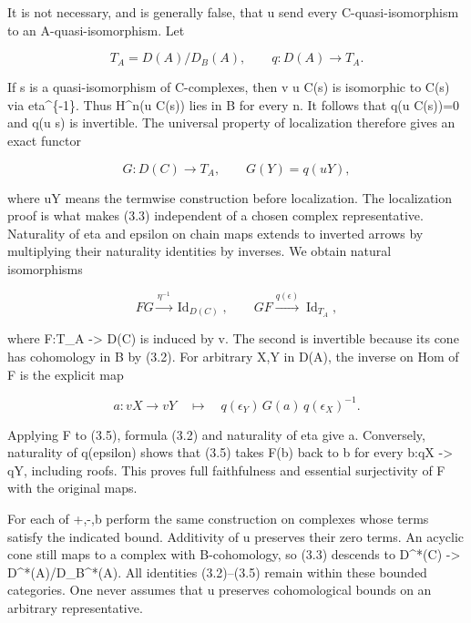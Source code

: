 \documentclass[11pt]{article}
\begin{document}
It is not necessary,\allowbreak{} and is generally false,\allowbreak{} that u send every C-quasi-isomorphism to an A-quasi-isomorphism. Let

\[
 T_A=D(A)/D_B(A),\qquad q:D(A)\longrightarrow T_A.
\]

If s is a quasi-isomorphism of C-complexes,\allowbreak{} then v u C(s)\allowbreak{} is isomorphic to C(s)\allowbreak{} via eta\^{}\{-1\}. Thus H\^{}n(u C(s)\allowbreak{})\allowbreak{} lies in B for every n. It follows that q(u C(s)\allowbreak{})\allowbreak{}\allowbreak{}=0 and q(u s)\allowbreak{} is invertible. The universal property of localization therefore gives an exact functor

\[
 G:D(C)\longrightarrow T_A,\qquad G(Y)=q(uY),              \tag{3.3}
\]

where uY means the termwise construction before localization. The localization proof is what makes (3.3)\allowbreak{} independent of a chosen complex representative. Naturality of eta and epsilon on chain maps extends to inverted arrows by multiplying their naturality identities by inverses. We obtain natural isomorphisms

\[
 F G\xrightarrow{\eta^{-1}}\operatorname{Id}_{D(C)},\qquad
 G F\xrightarrow{q(\epsilon)}\operatorname{Id}_{T_A},      \tag{3.4}
\]

where F:\allowbreak{}T\_\allowbreak{}A \allowbreak{}-> D(C)\allowbreak{} is induced by v. The second is invertible because its cone has cohomology in B by (3.2)\allowbreak{}. For arbitrary X,\allowbreak{}Y in D(A)\allowbreak{},\allowbreak{} the inverse on Hom of F is the explicit map

\[
 a:vX\longrightarrow vY
 \quad\longmapsto\quad
 q(\epsilon_Y)\,G(a)\,q(\epsilon_X)^{-1}.                 \tag{3.5}
\]

Applying F to (3.5)\allowbreak{},\allowbreak{} formula (3.2)\allowbreak{} and naturality of eta give a. Conversely,\allowbreak{} naturality of q(epsilon)\allowbreak{} shows that (3.5)\allowbreak{} takes F(b)\allowbreak{} back to b for every b:\allowbreak{}qX \allowbreak{}-> qY,\allowbreak{} including roofs. This proves full faithfulness and essential surjectivity of F with the original maps.

For each of \allowbreak{}+,\allowbreak{}-,\allowbreak{}b perform the same construction on complexes whose terms satisfy the indicated bound. Additivity of u preserves their zero terms. An acyclic cone still maps to a complex with B-cohomology,\allowbreak{} so (3.3)\allowbreak{} descends to D\textasciicircum{}*(C)\allowbreak{} \allowbreak{}-> D\textasciicircum{}*(A)\allowbreak{}/\allowbreak{}D\_\allowbreak{}B\textasciicircum{}*(A)\allowbreak{}. All identities (3.2)\allowbreak{}–\allowbreak{}(3.5)\allowbreak{} remain within these bounded categories. One never assumes that u preserves cohomological bounds on an arbitrary representative.
\end{document}
